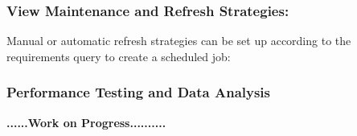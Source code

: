 \subsubsection{View Maintenance and Refresh Strategies:} Manual or automatic refresh strategies can be set up according to the requirements query to create a scheduled job:



\subsubsection{Performance Testing and Data Analysis}

\textbf{......\textbf{Work on Progress}..........}       